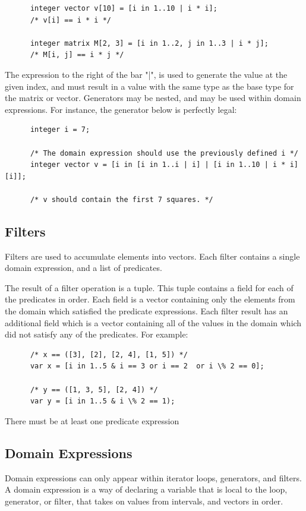 \documentclass{article}
\begin{document}
    \begin{lstlisting}
      integer vector v[10] = [i in 1..10 | i * i];
      /* v[i] == i * i */

      integer matrix M[2, 3] = [i in 1..2, j in 1..3 | i * j];
      /* M[i, j] == i * j */
    \end{lstlisting}

    The expression to the right of the bar "|", is used to generate the value at the given index, and must result in
    a value with the same type as the base type for the matrix or vector. Generators may be nested, and may be used
    within domain expressions. For instance, the generator below is perfectly legal:

    \begin{lstlisting}
      integer i = 7;

      /* The domain expression should use the previously defined i */
      integer vector v = [i in [i in 1..i | i] | [i in 1..10 | i * i][i]];

      /* v should contain the first 7 squares. */
    \end{lstlisting}


  \subsection{Filters}\label{sec:filters}

    Filters are used to accumulate elements into vectors. Each filter contains a single domain expression, and a
    list of predicates.

    The result of a filter operation is a tuple. This tuple contains a field for each of the predicates in order.
    Each field is a vector containing only the elements from the domain which satisfied the predicate expressions.
    Each filter result has an additional field which is a vector containing all of the values in the domain which
    did not satisfy any of the predicates. For example:

    \begin{lstlisting}
      /* x == ([3], [2], [2, 4], [1, 5]) */
      var x = [i in 1..5 & i == 3 or i == 2  or i \% 2 == 0];

      /* y == ([1, 3, 5], [2, 4]) */
      var y = [i in 1..5 & i \% 2 == 1);
    \end{lstlisting}

    There must be at least one predicate expression

  \subsection{Domain Expressions}
    Domain expressions can only appear within iterator loops, generators, and filters. A domain expression is a way
    of declaring a variable that is local to the loop, generator, or filter, that takes on values from intervals,
    and vectors in order.
\end{document}
